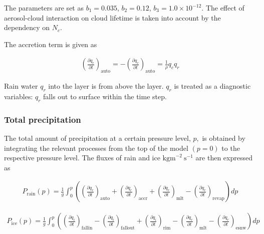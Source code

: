 The parameters are set as \(b_1 = 0.035\), \(b_2 =0.12\),
\(b_3 = 1.0\times10^{-12}\). The effect of aerosol-cloud interaction on
cloud lifetime is taken into account by the dependency on \(N_c\).

The accretion term is given as

\begin{eqnarray}
\left(\frac{\partial q_r}{\partial t}\right)_{\text {auto}}
=-\left(\frac{\partial q_c}{\partial t}\right)_{\text {auto}}
=\frac{1}{\rho}q_c q_r
\end{eqnarray}

Rain water \(q_r\) into the layer is from above the layer. \(q_r\) is
treated as a diagnostic variables: \(q_r\) falls out to surface within
the time step.

\hypertarget{total-precipitation}{%
\subsubsection{Total precipitation}\label{total-precipitation}}

The total amount of precipitation at a certain pressure level, \(p,\) is
obtained by integrating the relevant processes from the top of the model
\((p=0)\) to the respective pressure level. The fluxes of rain and ice
\(\mathrm{kgm}^{-2} \mathrm{~s}^{-1}\) are then expressed as

\begin{eqnarray}
P_{\text {rain}}(p) =\frac{1}{g} \int_{0}^{p}\left(
\left(\frac{\partial q_r}{\partial t}\right)_{\text {auto}}
+\left(\frac{\partial q_r}{\partial t}\right)_{\text {accr}}
+\left(\frac{\partial q_r}{\partial t}\right)_{\text {mlt}}
-\left(\frac{\partial q_r}{\partial t}\right)_{\text {revap}}
\right) d p
\end{eqnarray}

\begin{eqnarray}
P_{\text {ice}}(p)
=\frac{1}{g} \int_{0}^{p}\left(
\left(\frac{\partial q_i}{\partial t}\right)_{\text {fallin}}
-\left(\frac{\partial q_i}{\partial t}\right)_{\text {fallout}}
+\left(\frac{\partial q_i}{\partial t}\right)_{\text {rim}}
-\left(\frac{\partial q_r}{\partial t}\right)_{\text {mlt}}
-\left(\frac{\partial q_r}{\partial t}\right)_{\text {esnw}}
\right) d p
\end{eqnarray}
